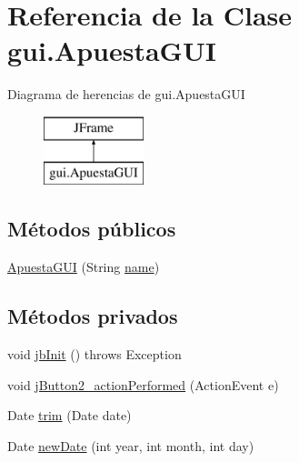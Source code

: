 \hypertarget{classgui_1_1ApuestaGUI}{}\section{Referencia de la Clase gui.\+Apuesta\+G\+UI}
\label{classgui_1_1ApuestaGUI}
Diagrama de herencias de gui.\+Apuesta\+G\+UI\begin{figure}[H]
\begin{center}
\leavevmode
\includegraphics[height=2.000000cm]{classgui_1_1ApuestaGUI}
\end{center}
\end{figure}
\subsection*{Métodos públicos}
\begin{DoxyCompactItemize}
\item 
\mbox{\hyperlink{classgui_1_1ApuestaGUI_a2ff2375bd3ced7a413fe0b32abe41ab7}{Apuesta\+G\+UI}} (String \mbox{\hyperlink{classgui_1_1ApuestaGUI_a520311ac991feb78793eb7a4116739b6}{name}})
\end{DoxyCompactItemize}
\subsection*{Métodos privados}
\begin{DoxyCompactItemize}
\item 
void \mbox{\hyperlink{classgui_1_1ApuestaGUI_a03af55fd60373262f10ef78d4edf7d2f}{jb\+Init}} ()  throws Exception 	
\item 
void \mbox{\hyperlink{classgui_1_1ApuestaGUI_a2e97c029d3c873140f035b1d3d12bc86}{j\+Button2\+\_\+action\+Performed}} (Action\+Event e)
\item 
Date \mbox{\hyperlink{classgui_1_1ApuestaGUI_adad0c9f21566e2386874ff84e3d84ddf}{trim}} (Date date)
\item 
Date \mbox{\hyperlink{classgui_1_1ApuestaGUI_a99fcb2ceb414bc50e5f20b522f403f56}{new\+Date}} (int year, int month, int day)
\end{DoxyCompactItemize}
